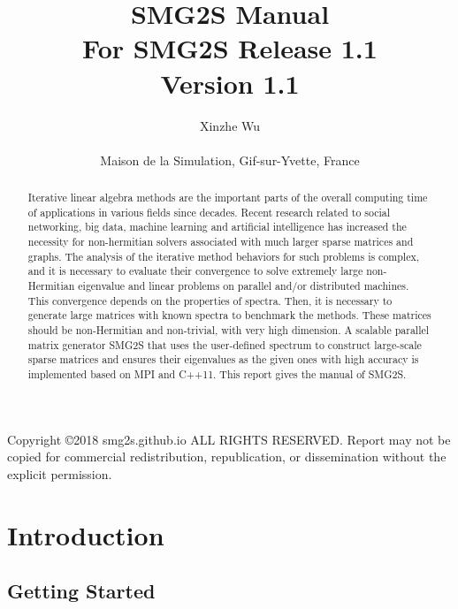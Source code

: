 \documentclass[a4paper, 10 pt]{report}
\title{{\Huge SMG2S Manual}\\
	\vspace{1cm}
	\large {For SMG2S Release 1.1} \\
	\vspace{2cm}
	\Large	Version 1.1\\}
\author{
	\Large Xinzhe Wu\\
	~\\
	Maison de la Simulation, Gif-sur-Yvette, France
}
\begin{document}
	\maketitle
	\pagestyle{empty}
	Copyright \copyright 2018 smg2s.github.io ALL RIGHTS RESERVED.
	Report may not be copied for commercial redistribution, republication, or dissemination without the explicit permission.
	
	\begin{abstract}
	Iterative linear algebra methods are the important parts of the overall computing time of applications in various fields since decades. Recent research related to social networking, big data, machine learning and artificial intelligence has increased the necessity for non-hermitian solvers associated with much larger sparse matrices and graphs. The analysis of the iterative method behaviors for such problems is complex, and it is necessary to evaluate their convergence to solve extremely large non-Hermitian eigenvalue and linear problems on parallel and/or distributed machines. This convergence depends on the properties of spectra. Then, it is necessary to generate large matrices with known spectra to benchmark the methods. These matrices should be non-Hermitian and non-trivial, with very high dimension. A scalable parallel matrix generator SMG2S that uses the user-defined spectrum to construct large-scale sparse matrices and ensures their eigenvalues as the given ones with high accuracy is implemented based on MPI and C++11. This report gives the manual of SMG2S.
	\end{abstract}
	\newpage
	\thispagestyle{empty}
	\mbox{}
	\tableofcontents
	\newpage
	\thispagestyle{empty}
	\mbox{}
	
	\pagestyle{myheadings}
	
	\chapter{Introduction}
	
	\section{Getting Started}
\end{document}
